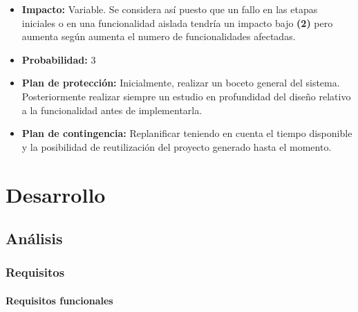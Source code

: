 \documentclass[openright,twoside,10pt]{book}
\providecommand{\tightlist}{%
  \setlength{\itemsep}{0pt}\setlength{\parskip}{0pt}}
\begin{document}
\begin{itemize}
      \begin{itemize}
      \tightlist
      \item
        \textbf{Impacto:} Variable. Se considera así puesto que un fallo en
        las etapas iniciales o en una funcionalidad aislada tendría un
        impacto bajo \textbf{(2)} pero aumenta según aumenta el numero de
        funcionalidades afectadas.
      \item
        \textbf{Probabilidad:} 3
      \item
        \textbf{Plan de protección:} Inicialmente, realizar un boceto
        general del sistema. Posteriormente realizar siempre un estudio en
        profundidad del diseño relativo a la funcionalidad antes de
        implementarla.
      \item
        \textbf{Plan de contingencia:} Replanificar teniendo en cuenta el
        tiempo disponible y la posibilidad de reutilización del proyecto
        generado hasta el momento.
      \end{itemize}
    \end{itemize}
    
    \chapter{ Desarrollo }
    
    \section{Análisis}\label{anuxe1lisis}
    
    \subsection{Requisitos}\label{requisitos}
    
    \subsubsection{Requisitos funcionales}\label{requisitos-funcionales}
    
\end{document}
